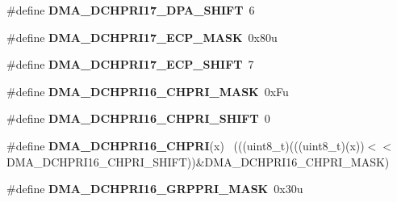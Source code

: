 \begin{DoxyCompactItemize}
\item 
\hypertarget{group___d_m_a___register___masks_gab33eb9aa88153662d13ec604a41192ee}{}\#define {\bfseries D\+M\+A\+\_\+\+D\+C\+H\+P\+R\+I17\+\_\+\+D\+P\+A\+\_\+\+S\+H\+I\+F\+T}~6\label{group___d_m_a___register___masks_gab33eb9aa88153662d13ec604a41192ee}

\item 
\hypertarget{group___d_m_a___register___masks_gafc268962e0ea23f09c8041255bb6c4d5}{}\#define {\bfseries D\+M\+A\+\_\+\+D\+C\+H\+P\+R\+I17\+\_\+\+E\+C\+P\+\_\+\+M\+A\+S\+K}~0x80u\label{group___d_m_a___register___masks_gafc268962e0ea23f09c8041255bb6c4d5}

\item 
\hypertarget{group___d_m_a___register___masks_ga9508a7395892f23dce16e285d3698432}{}\#define {\bfseries D\+M\+A\+\_\+\+D\+C\+H\+P\+R\+I17\+\_\+\+E\+C\+P\+\_\+\+S\+H\+I\+F\+T}~7\label{group___d_m_a___register___masks_ga9508a7395892f23dce16e285d3698432}

\item 
\hypertarget{group___d_m_a___register___masks_ga96aec3a7b7284bb549599c861061211a}{}\#define {\bfseries D\+M\+A\+\_\+\+D\+C\+H\+P\+R\+I16\+\_\+\+C\+H\+P\+R\+I\+\_\+\+M\+A\+S\+K}~0x\+Fu\label{group___d_m_a___register___masks_ga96aec3a7b7284bb549599c861061211a}

\item 
\hypertarget{group___d_m_a___register___masks_ga7b6787bf163d5897483a972f41c05960}{}\#define {\bfseries D\+M\+A\+\_\+\+D\+C\+H\+P\+R\+I16\+\_\+\+C\+H\+P\+R\+I\+\_\+\+S\+H\+I\+F\+T}~0\label{group___d_m_a___register___masks_ga7b6787bf163d5897483a972f41c05960}

\item 
\hypertarget{group___d_m_a___register___masks_gae636db5e066c9624c52e7b6e3d679001}{}\#define {\bfseries D\+M\+A\+\_\+\+D\+C\+H\+P\+R\+I16\+\_\+\+C\+H\+P\+R\+I}(x)                                    ~(((uint8\+\_\+t)(((uint8\+\_\+t)(x))$<$$<$D\+M\+A\+\_\+\+D\+C\+H\+P\+R\+I16\+\_\+\+C\+H\+P\+R\+I\+\_\+\+S\+H\+I\+F\+T))\&D\+M\+A\+\_\+\+D\+C\+H\+P\+R\+I16\+\_\+\+C\+H\+P\+R\+I\+\_\+\+M\+A\+S\+K)\label{group___d_m_a___register___masks_gae636db5e066c9624c52e7b6e3d679001}

\item 
\hypertarget{group___d_m_a___register___masks_ga92dc82e2a30200989f5cc2e3fe69d463}{}\#define {\bfseries D\+M\+A\+\_\+\+D\+C\+H\+P\+R\+I16\+\_\+\+G\+R\+P\+P\+R\+I\+\_\+\+M\+A\+S\+K}~0x30u\label{group___d_m_a___register___masks_ga92dc82e2a30200989f5cc2e3fe69d463}


\end{DoxyCompactItemize}
